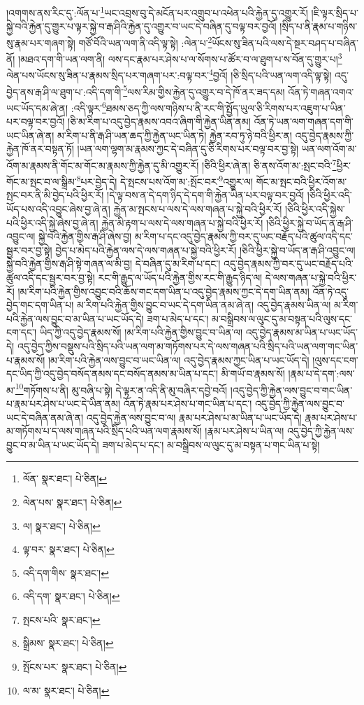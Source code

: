 །འགགས་ནས་རིང་དུ་:ལོན་པ་\footnote{ལོན་  སྣར་ཐང་།  པེ་ཅིན། }ཡང་འབྲས་བུ་དེ་མངོན་པར་འགྲུབ་པ་འཕེན་པའི་རྐྱེན་དུ་འགྱུར་རོ། །ཇི་ལྟར་སྲིད་པ་སྐྱེ་བའི་རྐྱེན་དུ་གྱུར་པ་ལྟར་སྐྱེ་བ་རྒ་ཤིའི་རྐྱེན་དུ་འགྱུར་བ་ཡང་དེ་བཞིན་དུ་བལྟ་བར་བྱའོ། །སྲིད་པ་ནི་རྣམ་པ་གཉིས་སུ་རྣམ་པར་གཞག་སྟེ། གཙོ་བོའི་ཡན་ལག་ནི་འདི་ལྟ་སྟེ། :ལེན་པ་\footnote{ལེན་པས་  སྣར་ཐང་།  པེ་ཅིན། }ཡོངས་སུ་ཟིན་པའི་ལས་དེ་སྔར་བཤད་པ་བཞིན་ནོ། །མཐའ་དག་གི་ཡན་ལག་ནི། ལས་དང་རྣམ་པར་ཤེས་པ་ལ་སོགས་པ་ཚོར་བ་ལ་ཐུག་པ་ས་བོན་དུ་གྱུར་པ།\footnote{ལ།  སྣར་ཐང་།  པེ་ཅིན། } ལེན་པས་ཡོངས་སུ་ཟིན་པ་རྣམས་སྲིད་པར་གཞག་པར་:བལྟ་བར་\footnote{ལྟ་བར་  སྣར་ཐང་།  པེ་ཅིན། }བྱའོ། །ཅི་སྲིད་པའི་ཡན་ལག་འདི་ལྟ་སྟེ། འདུ་བྱེད་ནས་རྒ་ཤི་ལ་ཐུག་པ་:འདི་དག་གི་\footnote{འདི་དག་གིས་  སྣར་ཐང་། }ལས་རིམ་གྱིས་རྐྱེན་དུ་འགྱུར་བ་དེ་ཁོ་ནར་ཟད་དམ། འོན་ཏེ་གཞན་འགའ་ཡང་ཡོད་དམ་ཞེ་ན། :འདི་ལྟར་\footnote{འདི་དག་  སྣར་ཐང་།  པེ་ཅིན། }ཐམས་ཅད་ཀྱི་ལས་གཉིས་པ་ནི་རང་གི་སྤྱོད་ཡུལ་ཅི་རིགས་པར་འཇུག་པ་ཡིན་པར་བལྟ་བར་བྱའོ། །ཅི་མ་རིག་པ་འདུ་བྱེད་རྣམས་འབའ་ཞིག་གི་རྐྱེན་ཡིན་ནམ། འོན་ཏེ་ཡན་ལག་གཞན་དག་གི་ཡང་ཡིན་ཞེ་ན། མ་རིག་པ་ནི་རྒ་ཤི་ཡན་ཆད་ཀྱི་རྐྱེན་ཡང་ཡིན་ཏེ། རྐྱེན་རབ་ཏུ་ཉེ་བའི་ཕྱིར་ན། འདུ་བྱེད་རྣམས་ཀྱི་རྐྱེན་ཁོ་ནར་བསྟན་ཏོ། །ཡན་ལག་ལྷག་མ་རྣམས་ཀྱང་དེ་བཞིན་དུ་ཅི་རིགས་པར་བལྟ་བར་བྱ་སྟེ། ཡན་ལག་འོག་མ་འོག་མ་རྣམས་ནི་གོང་མ་གོང་མ་རྣམས་ཀྱི་རྐྱེན་དུ་མི་འགྱུར་རོ། །ཅིའི་ཕྱིར་ཞེ་ན། ཅི་ནས་འོག་མ་:སྤང་བའི་\footnote{སྤངས་པའི་  སྣར་ཐང་། }ཕྱིར་གོང་མ་སྤང་བ་ལ་སྒྲིམ་\footnote{སྒྲིམས་  སྣར་ཐང་།  པེ་ཅིན། }པར་བྱེད་དེ། དེ་སྤངས་པས་འོག་མ་:སྤོང་བར་\footnote{སྤོངས་པར་  སྣར་ཐང་།  པེ་ཅིན། }འགྱུར་ལ། གོང་མ་སྤང་བའི་ཕྱིར་འོག་མ་སྤང་བར་ནི་མི་བྱེད་པའི་ཕྱིར་རོ། །དེ་ལྟ་བས་ན་དེ་དག་ཉིད་དེ་དག་གི་རྐྱེན་ཡིན་པར་བལྟ་བར་བྱའོ། །ཅིའི་ཕྱིར་འདི་ཡོད་པས་འདི་འབྱུང་ཞེས་བྱ་ཞེ་ན། རྐྱེན་མ་སྤངས་པ་ལས་དེ་ལས་གཞན་པ་སྐྱེ་བའི་ཕྱིར་རོ། །ཅིའི་ཕྱིར་འདི་སྐྱེས་པའི་ཕྱིར་འདི་སྐྱེ་ཞེས་བྱ་ཞེ་ན། རྐྱེན་མི་རྟག་པ་ལས་དེ་ལས་གཞན་པ་སྐྱེ་བའི་ཕྱིར་རོ། །ཅིའི་ཕྱིར་སྐྱེ་བ་ཡོད་ན་རྒ་ཤི་འབྱུང་ལ། སྐྱེ་བའི་རྐྱེན་གྱིས་རྒ་ཤི་ཞེས་བྱ། མ་རིག་པ་དང་འདུ་བྱེད་རྣམས་ཀྱི་བར་དུ་ཡང་བརྗོད་པའི་ཚུལ་འདི་དང་སྦྱར་བར་བྱ་སྟེ། བྱེད་པ་མེད་པའི་རྐྱེན་ལས་དེ་ལས་གཞན་པ་སྐྱེ་བའི་ཕྱིར་རོ། །ཅིའི་ཕྱིར་སྐྱེ་བ་ཡོད་ན་རྒ་ཤི་འབྱུང་ལ། སྐྱེ་བའི་རྐྱེན་གྱིས་རྒ་ཤི་སྟེ་གཞན་ལ་མི་བྱ། དེ་བཞིན་དུ་མ་རིག་པ་དང་། འདུ་བྱེད་རྣམས་ཀྱི་བར་དུ་ཡང་བརྗོད་པའི་ཚུལ་འདི་དང་སྦྱར་བར་བྱ་སྟེ། རང་གི་རྒྱུད་ལ་ཡོད་པའི་རྐྱེན་གྱིས་རང་གི་རྒྱུད་ཉིད་ལ། དེ་ལས་གཞན་པ་སྐྱེ་བའི་ཕྱིར་རོ། །མ་རིག་པའི་རྐྱེན་གྱིས་འབྱུང་བའི་ཆོས་གང་དག་ཡིན་པ་འདུ་བྱེད་རྣམས་ཀྱང་དེ་དག་ཡིན་ནམ། འོན་ཏེ་འདུ་བྱེད་གང་དག་ཡིན་པ། མ་རིག་པའི་རྐྱེན་གྱིས་བྱུང་བ་ཡང་དེ་དག་ཡིན་ནམ་ཞེ་ན། འདུ་བྱེད་རྣམས་ཡིན་ལ། མ་རིག་པའི་རྐྱེན་ལས་བྱུང་བ་མ་ཡིན་པ་ཡང་ཡོད་དེ། ཟག་པ་མེད་པ་དང་། མ་བསྒྲིབས་ལ་ལུང་དུ་མ་བསྟན་པའི་ལུས་དང་ངག་དང་། ཡིད་ཀྱི་འདུ་བྱེད་རྣམས་སོ། །མ་རིག་པའི་རྐྱེན་གྱིས་བྱུང་བ་ཡིན་ལ། འདུ་བྱེད་རྣམས་མ་ཡིན་པ་ཡང་ཡོད་དེ། འདུ་བྱེད་ཀྱིས་བསྡུས་པའི་སྲིད་པའི་ཡན་ལག་མ་གཏོགས་པར་དེ་ལས་གཞན་པའི་སྲིད་པའི་ཡན་ལག་གང་ཡིན་པ་རྣམས་སོ། །མ་རིག་པའི་རྐྱེན་ལས་བྱུང་བ་ཡང་ཡིན་ལ། འདུ་བྱེད་རྣམས་ཀྱང་ཡིན་པ་ཡང་ཡོད་དེ། །ལུས་དང་ངག་དང་ཡིད་ཀྱི་འདུ་བྱེད་བསོད་ནམས་དང་བསོད་ནམས་མ་ཡིན་པ་དང་། མི་གཡོ་བ་རྣམས་སོ། །རྣམ་པ་དེ་དག་:ལས་མ་\footnote{ལ་མ་  སྣར་ཐང་།  པེ་ཅིན། }གཏོགས་པ་ནི། མུ་བཞི་པ་སྟེ། དེ་ལྟར་ན་འདི་ནི་མུ་བཞིར་དབྱེ་བའོ། །འདུ་བྱེད་ཀྱི་རྐྱེན་ལས་བྱུང་བ་གང་ཡིན་པ་རྣམ་པར་ཤེས་པ་ཡང་དེ་ཡིན་ནམ། འོན་ཏེ་རྣམ་པར་ཤེས་པ་གང་ཡིན་པ་དང་། འདུ་བྱེད་ཀྱི་རྐྱེན་ལས་བྱུང་བ་ཡང་དེ་བཞིན་ནམ་ཞེ་ན། འདུ་བྱེད་རྐྱེན་ལས་བྱུང་བ་ལ། རྣམ་པར་ཤེས་པ་མ་ཡིན་པ་ཡང་ཡོད་དེ། རྣམ་པར་ཤེས་པ་མ་གཏོགས་པ་ད་ལས་གཞན་པའི་སྲིད་པའི་ཡན་ལག་རྣམས་སོ། །རྣམ་པར་ཤེས་པ་ཡིན་ལ། འདུ་བྱེད་ཀྱི་རྐྱེན་ལས་བྱུང་བ་མ་ཡིན་པ་ཡང་ཡོད་དེ། ཟག་པ་མེད་པ་དང་། མ་བསྒྲིབས་ལ་ལུང་དུ་མ་བསྟན་པ་གང་ཡིན་པ་སྟེ། 